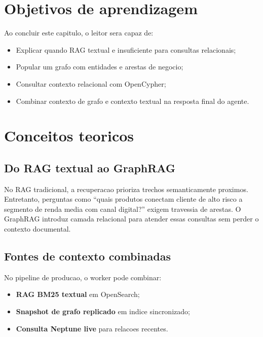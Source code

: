 \section{Objetivos de aprendizagem}

Ao concluir este capitulo, o leitor sera capaz de:

\begin{itemize}[leftmargin=*]
  \item Explicar quando RAG textual e insuficiente para consultas relacionais;
  \item Popular um grafo com entidades e arestas de negocio;
  \item Consultar contexto relacional com OpenCypher;
  \item Combinar contexto de grafo e contexto textual na resposta final do agente.
\end{itemize}

\section{Conceitos teoricos}

\subsection{Do RAG textual ao GraphRAG}

No RAG tradicional, a recuperacao prioriza trechos semanticamente proximos.
Entretanto, perguntas como ``quais produtos conectam cliente de alto risco a
segmento de renda media com canal digital?'' exigem travessia de arestas.
O GraphRAG introduz camada relacional para atender
essas consultas sem perder o contexto documental.

\subsection{Fontes de contexto combinadas}

No pipeline de producao, o worker pode combinar:

\begin{itemize}[leftmargin=*]
  \item \textbf{RAG BM25 textual} em OpenSearch;
  \item \textbf{Snapshot de grafo replicado} em indice sincronizado;
  \item \textbf{Consulta Neptune live} para relacoes recentes.
\end{itemize}

